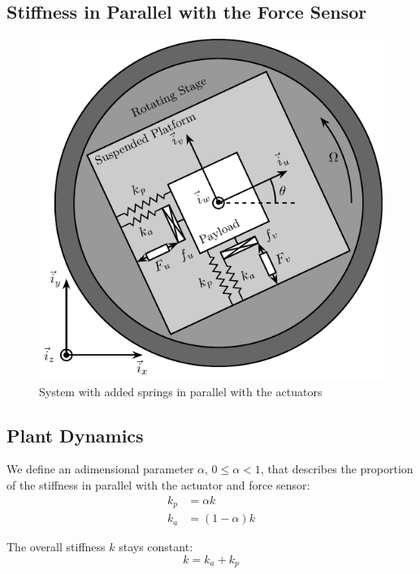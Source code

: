 \documentclass{ISMA_USD2020}
\begin{document}
\subsection{Stiffness in Parallel with the Force Sensor}
\label{sec:orgdfd59fa}
\begin{figure}[htbp]
\centering
\includegraphics[scale=1]{figs/system_parallel_springs.pdf}
\caption{\label{fig:system_parallel_springs}System with added springs in parallel with the actuators}
\end{figure}

\subsection{Plant Dynamics}
\label{sec:org70fc8fa}

We define an adimensional parameter \(\alpha\), \(0 \le \alpha < 1\), that describes the proportion of the stiffness in parallel with the actuator and force sensor:
\begin{subequations}
  \begin{align}
    k_p &= \alpha k \\
    k_a &= (1 - \alpha) k
  \end{align}
\end{subequations}

The overall stiffness \(k\) stays constant:
\begin{equation}
  k = k_a + k_p
\end{equation}
\end{document}
